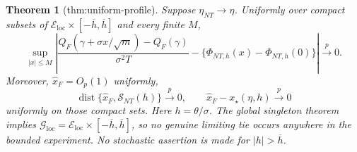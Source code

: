 \documentclass{article}
\newtheorem{theorem}{Theorem}
\begin{document}
\begin{theorem}[thm:uniform-profile]\label{thm:uniform-profile}
Suppose \(\eta_{NT}\to\eta\).  Uniformly over compact subsets of
\(\mathcal E_{\mathrm{loc}}\times[-\overline h,\overline h]\) and every finite \(M\),
\[
\sup_{|x|\leq M}\left|
\frac{Q_F(\gamma+\sigma x/\sqrt m)-Q_F(\gamma)}{\sigma^2T}
-\{\Phi_{NT,h}(x)-\Phi_{NT,h}(0)\}
\right|\xrightarrow{p}0.
\]
Moreover, \(\widehat x_F=O_p(1)\) uniformly,
\[
\operatorname{dist}\{\widehat x_F,\mathcal S_{NT}(h)\}\xrightarrow{p}0,
\qquad
\widehat x_F-x_\star(\eta,h)\xrightarrow{p}0
\]
uniformly on those compact sets.  Here \(h=\theta/\sigma\).  The global singleton theorem implies
\(\mathcal G_{\mathrm{loc}}=\mathcal E_{\mathrm{loc}}\times[-\overline h,\overline h]\),
so no genuine limiting tie occurs anywhere in the bounded experiment.  No stochastic assertion is made for \(|h|>\overline h\).
\end{theorem}
\end{document}
